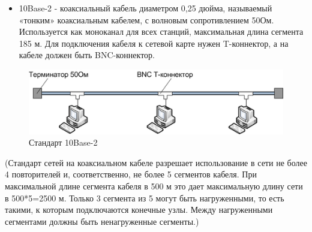\begin{itemize}
        \item 10Base-2 - коаксиальный кабель диаметром 0,25 дюйма, называемый «тонким» коаксиальным кабелем, с волновым сопротивлением 50Ом. Используется как моноканал для всех станций, максимальная длина сегмента 185 м. Для подключения кабеля к сетевой карте нужен T-коннектор, а на кабеле должен быть BNC-коннектор.
\end{itemize}
\begin{figure}[H]
	\begin{center}
	    \includegraphics[scale=0.7]{fig/10Base-2.png}
        \caption{Стандарт 10Base-2}
	    \label{pic:10Base-2} %
    \end{center}
\end{figure}  

\noindent(Стандарт сетей на коаксиальном кабеле разрешает использование в сети не более 4 повторителей и, соответственно, не более 5 сегментов кабеля. При максимальной длине сегмента кабеля в 500 м это дает максимальную длину сети в 500*5=2500 м. Только 3 сегмента из 5 могут быть нагруженными, то есть такими, к которым подключаются конечные узлы. Между нагруженными сегментами должны быть ненагруженные сегменты.)

